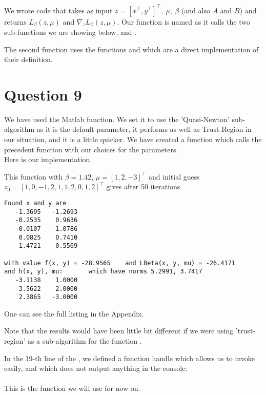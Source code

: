 \documentclass{article}
\newcommand{\tp}{^\top}
\begin{document}
We wrote code that takes as input $z = [x\tp, y\tp]\tp,\ \mu,\ \beta$ (and also $A$ and $B$) and returns $L_\beta(z, \mu)$ and $\nabla_z L_\beta(z, \mu)$.
Our function is named  as it calls the two sub-functions we are showing below,  and .







The second function uses the functions  and  which are a direct implementation of their definition.

\section*{Question 9}

We have used the Matlab  function. We set it to use the 'Quasi-Newton' sub-algorithm as it is the default parameter, it performs as well as Trust-Region in our situation, and it is a little quicker.
We have created a function  which calls the precedent function with our choices for the parameters.\\
Here is our implementation.



This function with $\beta = 1.42$, $\mu = [1, 2, -3]\tp$ and initial guess $z_0 = [1, 0, -1, 2, 1, 1, 2, 0, 1, 2]\tp$  gives after 50 iterations
\begin{lstlisting}
Found x and y are
   -1.3695   -1.2693
   -0.2535    0.9636
   -0.0107   -1.0786
    0.0825    0.7410
    1.4721    0.5569

with value f(x, y) = -28.9565    and LBeta(x, y, mu) = -26.4171
and h(x, y), mu:       which have norms 5.2991, 3.7417
   -3.1138    1.0000
   -3.5622    2.0000
    2.3865   -3.0000
\end{lstlisting}
One can see the full listing in the Appendix.

Note that the results would have been little bit different if we were using 'trust-region' as a sub-algorithm for the function .

In the 19-th line of the , we defined a function handle which allows us to invoke  easily, and which does not output anything in the console:\\
\\
This is the function we will use for now on.
\end{document}
